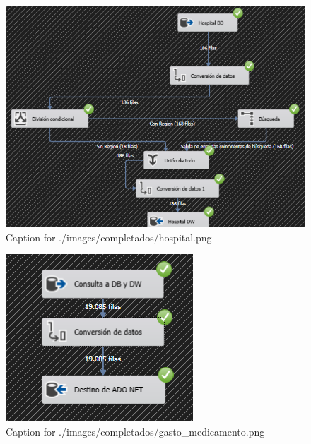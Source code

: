 \documentclass{article}
\begin{document}
\begin{figure}[H]
  \centering
  \includegraphics[width=\linewidth]{./images/completados/hospital.png}
  \caption{Caption for ./images/completados/hospital.png}
\end{figure}
\begin{figure}[H]
  \centering
  \includegraphics[width=\linewidth]{./images/completados/gasto_medicamento.png}
  \caption{Caption for ./images/completados/gasto_medicamento.png}
\end{figure}
\end{document}
